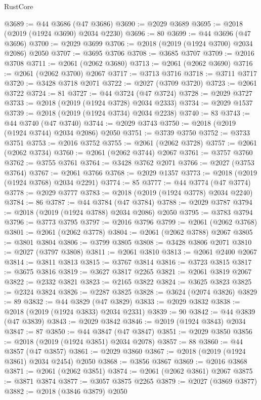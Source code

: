 \begin{lexlean}{RustCore}
\begin{coremodule}
@3689 := @44 @3686 (@47 @3686)
@3690 := @2029 @3689
@3695 := @2018 (@2019 (@1924 @3690) @2034 @2230)
@3696 := 80
@3699 := @44 @3696 (@47 @3696)
@3700 := @2029 @3699
@3706 := @2018 (@2019 (@1924 @3700) @2034 @2086) @2050
@3707 := @3695 @3706
@3708 := @3685 @3707
@3709 := @2016 @3708
@3711 := @2061 (@2062 @3680)
@3713 := @2061 (@2062 @3690)
@3716 := @2061 (@2062 @3700) @2067
@3717 := @3713 @3716
@3718 := @3711 @3717
@3720 := @3428 @3718 @2071
@3722 := @2027 (@3709 @3720)
@3723 := @2061 @3722
@3724 := 81
@3727 := @44 @3724 (@47 @3724)
@3728 := @2029 @3727
@3733 := @2018 (@2019 (@1924 @3728) @2034 @2333)
@3734 := @2029 @1537
@3739 := @2018 (@2019 (@1924 @3734) @2034 @2238)
@3740 := 83
@3743 := @44 @3740 (@47 @3740)
@3744 := @2029 @3743
@3750 := @2018 (@2019 (@1924 @3744) @2034 @2086) @2050
@3751 := @3739 @3750
@3752 := @3733 @3751
@3753 := @2016 @3752
@3755 := @2061 (@2062 @3728)
@3757 := @2061 (@2062 @3734)
@3760 := @2061 (@2062 @3744) @2067
@3761 := @3757 @3760
@3762 := @3755 @3761
@3764 := @3428 @3762 @2071
@3766 := @2027 (@3753 @3764)
@3767 := @2061 @3766
@3768 := @2029 @1357
@3773 := @2018 (@2019 (@1924 @3768) @2034 @2291)
@3774 := 85
@3777 := @44 @3774 (@47 @3774)
@3778 := @2029 @3777
@3783 := @2018 (@2019 (@1924 @3778) @2034 @2240)
@3784 := 86
@3787 := @44 @3784 (@47 @3784)
@3788 := @2029 @3787
@3794 := @2018 (@2019 (@1924 @3788) @2034 @2086) @2050
@3795 := @3783 @3794
@3796 := @3773 @3795
@3797 := @2016 @3796
@3799 := @2061 (@2062 @3768)
@3801 := @2061 (@2062 @3778)
@3804 := @2061 (@2062 @3788) @2067
@3805 := @3801 @3804
@3806 := @3799 @3805
@3808 := @3428 @3806 @2071
@3810 := @2027 (@3797 @3808)
@3811 := @2061 @3810
@3813 := @2061 @2400 @2067
@3814 := @3811 @3813
@3815 := @3767 @3814
@3816 := @3723 @3815
@3817 := @3675 @3816
@3819 := @3627 @3817 @2265
@3821 := @2061 @3819 @2067
@3822 := @2332 @3821
@3823 := @2165 @3822
@3824 := @3625 @3823
@3825 := @2324 @3824
@3826 := @2287 @3825
@3828 := @3624 (@2074 @3826)
@3829 := 89
@3832 := @44 @3829 (@47 @3829)
@3833 := @2029 @3832
@3838 := @2018 (@2019 (@1924 @3833) @2034 @2331)
@3839 := 90
@3842 := @44 @3839 (@47 @3839)
@3843 := @2029 @3842
@3846 := @2019 (@1924 @3843) @2034
@3847 := 87
@3850 := @44 @3847 (@47 @3847)
@3851 := @2029 @3850
@3856 := @2018 (@2019 (@1924 @3851) @2034 @2078)
@3857 := 88
@3860 := @44 @3857 (@47 @3857)
@3861 := @2029 @3860
@3867 := @2018 (@2019 (@1924 @3861) @2034 @2454) @2050
@3868 := @3856 @3867
@3869 := @2016 @3868
@3871 := @2061 (@2062 @3851)
@3874 := @2061 (@2062 @3861) @2067
@3875 := @3871 @3874
@3877 := @3057 @3875 @2265
@3879 := @2027 (@3869 @3877)
@3882 := @2018 (@3846 @3879) @2050

\end{coremodule}
\end{lexlean}
